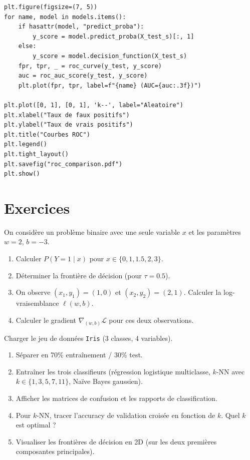 \begin{codeblock}[title=\textbf{Courbe ROC comparative}]
\begin{verbatim}
plt.figure(figsize=(7, 5))
for name, model in models.items():
    if hasattr(model, "predict_proba"):
        y_score = model.predict_proba(X_test_s)[:, 1]
    else:
        y_score = model.decision_function(X_test_s)
    fpr, tpr, _ = roc_curve(y_test, y_score)
    auc = roc_auc_score(y_test, y_score)
    plt.plot(fpr, tpr, label=f"{name} (AUC={auc:.3f})")

plt.plot([0, 1], [0, 1], 'k--', label="Aleatoire")
plt.xlabel("Taux de faux positifs")
plt.ylabel("Taux de vrais positifs")
plt.title("Courbes ROC")
plt.legend()
plt.tight_layout()
plt.savefig("roc_comparison.pdf")
plt.show()
\end{verbatim}
\end{codeblock}

\section{Exercices}
\label{sec:classif-exercices}

\begin{exercice}
On consid\`ere un probl\`eme binaire avec une seule variable $x$ et les param\`etres
$w = 2$, $b = -3$.
\begin{enumerate}
  \item Calculer $P(Y = 1 \mid x)$ pour $x \in \{0, 1, 1.5, 2, 3\}$.
  \item D\'eterminer la fronti\`ere de d\'ecision (pour $\tau = 0.5$).
  \item On observe $(x_1, y_1) = (1, 0)$ et $(x_2, y_2) = (2, 1)$. Calculer
        la log-vraisemblance $\ell(w, b)$.
  \item Calculer le gradient $\nabla_{(w,b)} \mathcal{L}$ pour ces deux observations.
\end{enumerate}
\end{exercice}

\begin{exercice}
Charger le jeu de donn\'ees \texttt{Iris} (3 classes, 4 variables).
\begin{enumerate}
  \item S\'eparer en 70\% entra\^inement / 30\% test.
  \item Entra\^iner les trois classifieurs (r\'egression logistique multiclasse,
        $k$-NN avec $k \in \{1, 3, 5, 7, 11\}$, Na\"ive Bayes gaussien).
  \item Afficher les matrices de confusion et les rapports de classification.
  \item Pour $k$-NN, tracer l'accuracy de validation crois\'ee en fonction de $k$.
        Quel $k$ est optimal ?
  \item Visualiser les fronti\`eres de d\'ecision en 2D (sur les deux premi\`eres
        composantes principales).
\end{enumerate}
\end{exercice}

